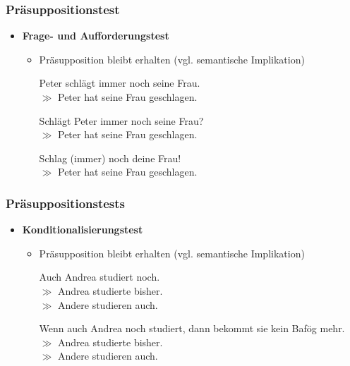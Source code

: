 
\begin{frame}
\frametitle{Präsuppositionstest}

\begin{itemize}
	\item \textbf{Frage- und Aufforderungstest}
	
	\begin{itemize}
		\item Präsupposition bleibt erhalten (vgl. semantische Implikation)

		\ea Peter schlägt immer noch seine Frau.\\ $\gg$ Peter hat seine Frau geschlagen.
		\z
		
		\ea Schlägt Peter immer noch seine Frau?\\ $\gg$ Peter hat seine Frau geschlagen.
		\z
		
		\ea Schlag (immer) noch deine Frau!\\ $\gg$ Peter hat seine Frau geschlagen.
		\z
		
		\end{itemize}

\end{itemize}

\end{frame}



\begin{frame}
\frametitle{Präsuppositionstests}

\begin{itemize}
\item \textbf{Konditionalisierungstest}

\vspace{5mm}

	\begin{itemize}
		\item Präsupposition bleibt erhalten (vgl. semantische Implikation)
		
		\ea Auch Andrea studiert noch.\\
			$\gg$ Andrea studierte bisher.\\
			$\gg$ Andere studieren auch.
		\z

			\ea Wenn auch Andrea noch studiert, dann bekommt sie kein Bafög mehr. \\
			$\gg$ Andrea studierte bisher.\\
			$\gg$ Andere studieren auch.
		\z

	\end{itemize}
	
\end{itemize}

\end{frame}



